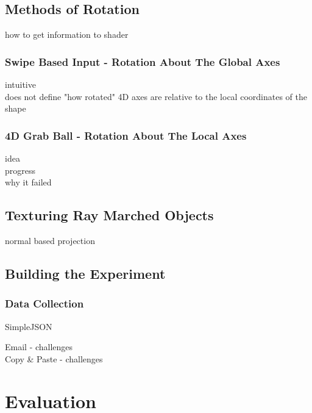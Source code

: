 \documentclass{l4proj}
\begin{document}
\section{Methods of Rotation}

how to get information to shader

\subsection{Swipe Based Input - Rotation About The Global Axes}

intuitive\\
does not define "how rotated" 4D axes are relative to the local coordinates of the shape

\subsection{4D Grab Ball - Rotation About The Local Axes}

idea\\
progress\\
why it failed

\section{Texturing Ray Marched Objects}

normal based projection

\citep{the_art_of_code_how_2020}

\section{Building the Experiment}

\subsection{}

\subsection{Data Collection}

SimpleJSON \citep{bunny83_simplejson_nodate}

Email - challenges\\
Copy \& Paste - challenges

\chapter{Evaluation} 
\end{document}
